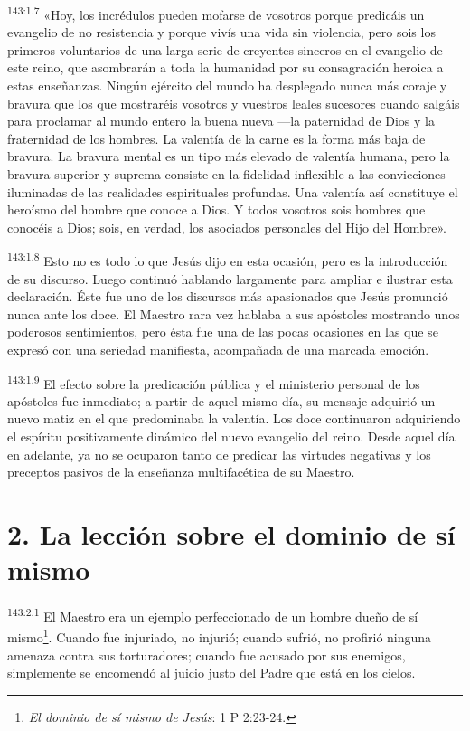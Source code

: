 \par
\textsuperscript{143:1.7} «Hoy, los incrédulos pueden mofarse de vosotros porque predicáis un evangelio de no resistencia y porque vivís una vida sin violencia, pero sois los primeros voluntarios de una larga serie de creyentes sinceros en el evangelio de este reino, que asombrarán a toda la humanidad por su consagración heroica a estas enseñanzas. Ningún ejército del mundo ha desplegado nunca más coraje y bravura que los que mostraréis vosotros y vuestros leales sucesores cuando salgáis para proclamar al mundo entero la buena nueva ---la paternidad de Dios y la fraternidad de los hombres. La valentía de la carne es la forma más baja de bravura. La bravura mental es un tipo más elevado de valentía humana, pero la bravura superior y suprema consiste en la fidelidad inflexible a las convicciones iluminadas de las realidades espirituales profundas. Una valentía así constituye el heroísmo del hombre que conoce a Dios. Y todos vosotros sois hombres que conocéis a Dios; sois, en verdad, los asociados personales del Hijo del Hombre».

\par
\textsuperscript{143:1.8} Esto no es todo lo que Jesús dijo en esta ocasión, pero es la introducción de su discurso. Luego continuó hablando largamente para ampliar e ilustrar esta declaración. Éste fue uno de los discursos más apasionados que Jesús pronunció nunca ante los doce. El Maestro rara vez hablaba a sus apóstoles mostrando unos poderosos sentimientos, pero ésta fue una de las pocas ocasiones en las que se expresó con una seriedad manifiesta, acompañada de una marcada emoción.

\par
\textsuperscript{143:1.9} El efecto sobre la predicación pública y el ministerio personal de los apóstoles fue inmediato; a partir de aquel mismo día, su mensaje adquirió un nuevo matiz en el que predominaba la valentía. Los doce continuaron adquiriendo el espíritu positivamente dinámico del nuevo evangelio del reino. Desde aquel día en adelante, ya no se ocuparon tanto de predicar las virtudes negativas y los preceptos pasivos de la enseñanza multifacética de su Maestro.

\section*{2. La lección sobre el dominio de sí mismo}
\par
\textsuperscript{143:2.1} El Maestro era un ejemplo perfeccionado de un hombre dueño de sí mismo\footnote{\textit{El dominio de sí mismo de Jesús}: 1 P 2:23-24.}. Cuando fue injuriado, no injurió; cuando sufrió, no profirió ninguna amenaza contra sus torturadores; cuando fue acusado por sus enemigos, simplemente se encomendó al juicio justo del Padre que está en los cielos.

